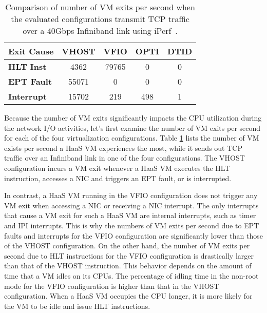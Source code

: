 \begin{table}
\renewcommand{\arraystretch}{1.2}
\small
\begin{center}
\begin{tabular}{|l|c|c|c|c|} \hline
{\bf Exit Cause} & {\bf VHOST } & {\bf VFIO} & {\bf OPTI} & {\bf DTID} \\ \hline
{\bf HLT Inst}   & 4362  & 79765 & 0    & 0    \\ \hline
{\bf EPT Fault}  & 55071 & 0     & 0    & 0    \\ \hline
{\bf Interrupt}  & 15702 & 219   & 498  & 1    \\ \hline
\end{tabular}
\end{center}
\vspace{-0.1in}
\caption{Comparison of number of VM exits per second when the
evaluated configurations transmit TCP traffic over a 40Gbps
Infiniband link using iPerf~\cite{iperf}.}
\label{tab:vm_exit}
\vspace{-0.1in}
\end{table}

Because the number of VM exits significantly impacts the CPU
utilization during the network I/O activities, let's first
examine the number of VM exits per second for each of the four
virtualization configurations. Table \ref{tab:vm_exit} lists
the number of VM exists per second a HaaS VM experiences the
most, while it sends out TCP traffic over an Infiniband link
in one of the four configurations. The VHOST configuration
incurs a VM exit whenever a HaaS VM executes the HLT
instruction, accesses a NIC and triggers an EPT fault, or is
interrupted.

In contrast, a HaaS VM running in the VFIO configuration does
not trigger any VM exit when accessing a NIC or receiving a
NIC interrupt. The only interrupts that cause a VM exit for
such a HaaS VM are internal interrupts, such as timer and IPI
interrupts. This is why the numbers of VM exits per second due
to EPT faults and interrupts for the VFIO configuration are
significantly lower than those of the VHOST configuration. On
the other hand, the number of VM exits per second due to HLT
instructions for the VFIO configuration is drastically larger
than that of the VHOST instruction. This behavior depends on
the amount of time that a VM idles on its CPUs. The percentage
of idling time in the non-root mode for the VFIO configuration
is higher than that in the VHOST configuration. When a HaaS VM
occupies the CPU longer, it is more likely for the VM to be
idle and issue HLT instructions.

